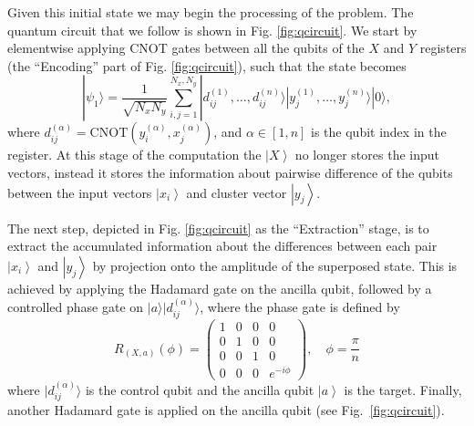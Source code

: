\documentclass[pra,showkeys,twocolumn,showpacs,aps,10pt]{revtex4-2}
\begin{document}
Given this initial state we may begin the processing of the problem.  The quantum circuit that we follow is shown in Fig. \ref{fig:qcircuit}. We start by elementwise applying CNOT gates between all the qubits of the $X$ and $Y$ registers (the ``Encoding'' part of Fig. \ref{fig:qcircuit}), such that the state becomes
%
\begin{equation}
    | \psi_1 \rangle  =
    \frac{1}{\sqrt{N_x N_y}} \sum_{i, j=1}^{N_x,N_y}
    | d^{(1)}_{ij}, \dots, d^{(n)}_{ij} \rangle
    | y^{(1)}_j, \dots, y^{(n)}_j \rangle
    | 0 \rangle ,
\end{equation}
%
where $d^{(\alpha)}_{ij} = \mathrm{CNOT}(y^{(\alpha)}_i, x^{(\alpha)}_j)$, and $\alpha \in  [1,n]$  is the qubit index in the register.
At this stage of the computation the $\left| X \right\rangle$ no longer stores the input vectors,
instead it stores the information about pairwise difference of the qubits between the input vectors $\left| x_i \right\rangle$ and cluster vector $\left| y_j \right\rangle$.

The next step, depicted in Fig. \ref{fig:qcircuit} as the ``Extraction'' stage, is to extract the accumulated information about the differences between each pair $\left| x_i \right\rangle$ and $\left| y_j \right\rangle$ by projection onto the amplitude of the superposed state. This is achieved by applying the Hadamard gate on the ancilla qubit, followed by a controlled phase gate on $ | a \rangle  |d_{ij}^{(\alpha)} \rangle$, where the phase gate is defined by
\begin{equation}
    \label{eq:controled_phase_rotation}
    R_{(X,a)}(\phi) =
    \begin{pmatrix}
        1 & 0 & 0 & 0 \\
        0 & 1 & 0 & 0 \\
        0 & 0 & 1 & 0 \\
        0 & 0 & 0 & e^{-i\phi}
    \end{pmatrix} ,
    \quad \phi = \frac{\pi}{n}
\end{equation}
%
where $ | d_{ij}^{(\alpha)} \rangle $ is the control qubit and the ancilla qubit $\left| a \right\rangle$ is the target. Finally, another Hadamard gate is applied on the ancilla qubit (see Fig.~\ref{fig:qcircuit}).
\end{document}
